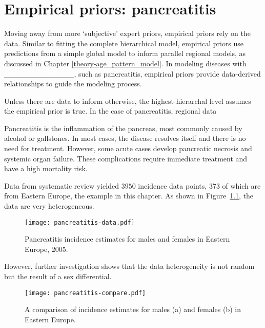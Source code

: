 \chapter{Empirical priors: pancreatitis}
\label{applications-priors_empirical}

Moving away from more `subjective' expert priors, empirical priors
rely on the data.  Similar to fitting the complete hierarchical model,
empirical priors use predictions from a simple global model to inform
parallel regional models, as discussed in Chapter
\ref{theory-age_pattern_model}.  In modeling diseases with
_____________, such as pancreatitis, empirical priors provide data-derived
relationships to guide the modeling process.

Unless there are data to inform otherwise, the highest hierarchal level assumes the empirical prior is true.  In the case of pancreatitis, regional data

Pancreatitis is the inflammation of the pancreas, most commonly 
caused by alcohol or gallstones.  In most cases, the disease resolves 
itself and there is no need for treatment.  However, some acute 
cases develop pancreatic necrosis and systemic organ failure.  These 
complications require immediate treatment and have a high mortality risk. 
\cite{raraty_acute_2004, banks_epidemiology_2002, sekimoto_JPN_2006}

Data from systematic review yielded $3950$ incidence data points, $373$ of which 
are from Eastern Europe, the example in this chapter.  As shown in 
Figure~\ref{fig:app-pan data}, the data are very heterogeneous.

    \begin{figure}[h]
        \begin{center}
            \texttt{[image: pancreatitis-data.pdf]}
            \caption{Pancreatitis incidence estimates for males and females
              in Eastern Europe, 2005.}
            \label{fig:app-pan data}
        \end{center}
    \end{figure}

However, further investigation shows that the data heterogeneity is not 
random but the result of a sex differential.

    \begin{figure}[h]
        \begin{center}
            \texttt{[image: pancreatitis-compare.pdf]}
            \caption{A comparison of incidence estimates for males (a) and 
              females (b) in Eastern Europe.}
            \label{fig:app-pan compare}
        \end{center}
    \end{figure}